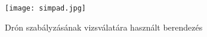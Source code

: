 \begin{figure}[H]
	\centering
	\texttt{[image: simpad.jpg]}
	\caption{Drón szabályzásának vizsválatára használt berendezés}
	\label{Drón szabályzásának vizsválatára használt berendezés}
\end{figure}
